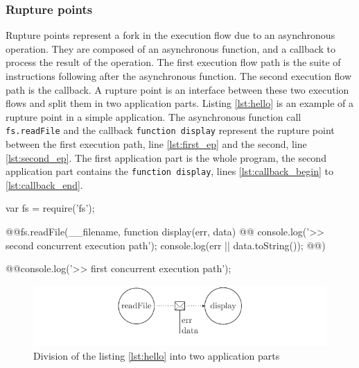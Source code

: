 \subsubsection{Rupture points}

Rupture points represent a fork in the execution flow due to an asynchronous operation.
They are composed of an asynchronous function, and a callback to process the result of the operation.
The first execution flow path is the suite of instructions following after the asynchronous function.
The second execution flow path is the callback.
A rupture point is an interface between these two execution flows and split them in two application parts.
Listing \ref{lst:hello} is an example of a rupture point in a simple application.
The asynchronous function call \texttt{fs.readFile} and the callback \texttt{function display} represent the rupture point between the first execution path, line \ref{lst:first_ep} and the second, line \ref{lst:second_ep}.
The first application part is the whole program, the second application part contains the \texttt{function display}, lines \ref{lst:callback_begin} to \ref{lst:callback_end}.

\begin{code}[js, caption={Example of a rupture point : an asynchronous function call, \texttt{fs.readFile()}, with a callback parameter, \texttt{function display}},label={lst:hello}]
var fs = require('fs');

@\label{lst:callback_begin}@fs.readFile(__filename, function display(err, data) {
@\label{lst:second_ep}@  console.log('>> second concurrent execution path');
  console.log(err || data.toString());
@\label{lst:callback_end}@})

@\label{lst:first_ep}@console.log('>> first concurrent execution path');
\end{code}

\begin{figure}[h!]
\begin{center}
  \includegraphics[width=\linewidth]{ressources/flux-1.pdf}
  \caption{Division of the listing \ref{lst:hello} into two application parts}
  \label{fig:flux-1}
\end{center}
\end{figure}

